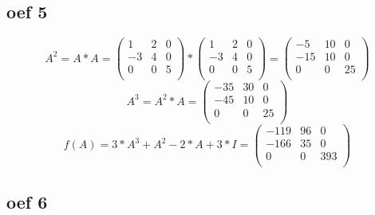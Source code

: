 \documentclass[lineaire_algebra_oplossingen.tex]{subfiles}
\begin{document}
\subsection{oef 5}
\[
   A^2 = A*A = \left( \begin{array}{ccc}
    1 & 2 & 0 \\
    -3 & 4 & 0 \\
    0 & 0 & 5 \\
  \end{array} \right) * \left( \begin{array}{ccc}
    1 & 2 & 0 \\
    -3 & 4 & 0 \\
    0 & 0 & 5 \\
  \end{array} \right) = \left( \begin{array}{ccc}
    -5 & 10 & 0 \\
    -15 & 10 & 0 \\
    0 & 0 & 25 \\
  \end{array} \right) 
  \]
\[ 
  A^3 = A^2 * A = \left( \begin{array}{ccc}
    -35 & 30 & 0 \\
    -45 & 10 & 0 \\
    0 & 0 & 25 \\
  \end{array} \right)
\]
\[
f(A) = 3*A^3 + A^2 - 2*A + 3*I =  \left( \begin{array}{ccc}
    -119 & 96 & 0 \\
    -166 & 35 & 0 \\
    0 & 0 & 393 \\
  \end{array} \right)
\]
\subsection{oef 6}
\end{document}
